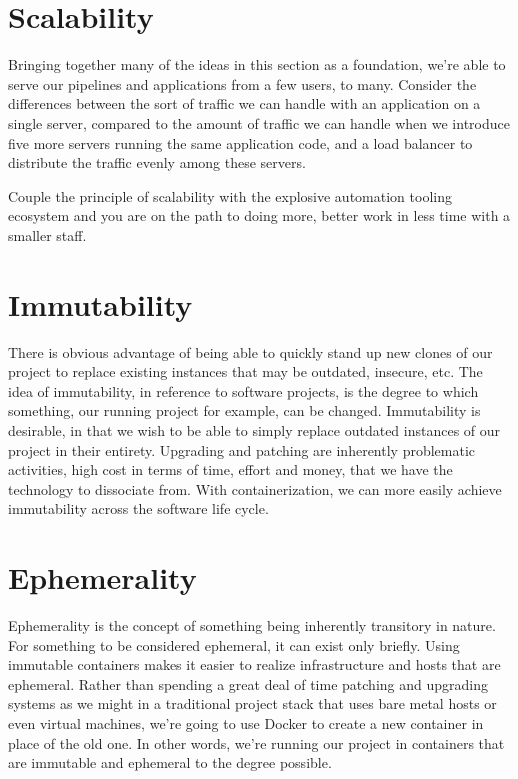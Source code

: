 \section{Scalability}

\justifying
Bringing together many of the ideas in this section as a foundation, we're able to serve our pipelines and applications from a few users, to many.
Consider the differences between the sort of traffic we can handle with an application on a single server, compared to the
amount of traffic we can handle when we introduce five more servers running the same application code, and a load balancer
to distribute the traffic evenly among these servers.

\justifying
Couple the principle of scalability with the explosive automation tooling ecosystem and you are on the path to doing more,
better work in less time with a smaller staff.

\section{Immutability}

\justifying
There is obvious advantage of being able to quickly stand up new clones of our project to replace existing instances that
may be outdated, insecure, etc. The idea of immutability, in reference to software projects, is the degree to which something,
our running project for example, can be changed. Immutability is desirable, in that we wish to be able to
simply replace outdated instances of our project in their entirety. Upgrading and patching are inherently
problematic activities, high cost in terms of time, effort and money, that we have the technology to dissociate from. With
containerization, we can more easily achieve immutability across the software life cycle.

\section{Ephemerality}

\justifying
Ephemerality is the concept of something being inherently transitory in nature. For something to be
considered ephemeral, it can exist only briefly. Using immutable containers makes it easier to realize
infrastructure and hosts that are ephemeral. Rather than spending a great deal of time patching and upgrading systems as
we might in a traditional project stack that uses bare metal hosts or even virtual machines, we're going to
use Docker to create a new container in place of the old one. In other words, we're running our project in containers that
are immutable and ephemeral to the degree possible.

